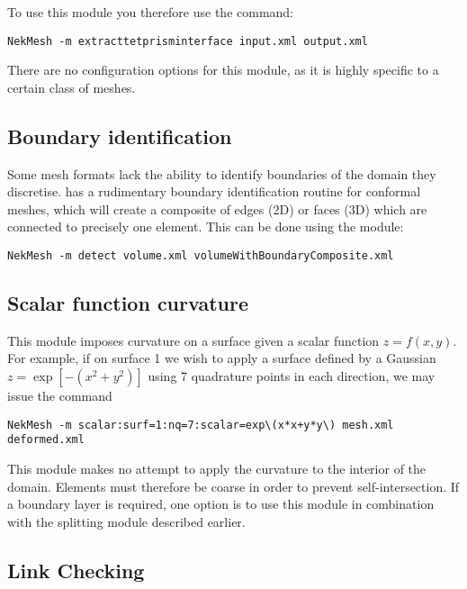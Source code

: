 To use this module you therefore use the command:

\begin{lstlisting}[style=BashInputStyle]
  NekMesh -m extracttetprisminterface input.xml output.xml
\end{lstlisting}

There are no configuration options for this module, as it is highly specific to
a certain class of meshes.

\subsection{Boundary identification}

Some mesh formats lack the ability to identify boundaries of the domain they
discretise. \nm has a rudimentary boundary identification routine for conformal
meshes, which will create a composite of edges (2D) or faces (3D) which are
connected to precisely one element. This can be done using the 
module:

\begin{lstlisting}[style=BashInputStyle]
  NekMesh -m detect volume.xml volumeWithBoundaryComposite.xml
\end{lstlisting}

\subsection{Scalar function curvature}

This module imposes curvature on a surface given a scalar function
$z=f(x,y)$. For example, if on surface 1 we wish to apply a surface defined by a
Gaussian $z = \exp[-(x^2+y^2)]$ using 7 quadrature points in each direction, we
may issue the command

\begin{lstlisting}[style=BashInputStyle]
  NekMesh -m scalar:surf=1:nq=7:scalar=exp\(x*x+y*y\) mesh.xml deformed.xml
\end{lstlisting}

\begin{notebox}
  This module makes no attempt to apply the curvature to the interior of the
  domain. Elements must therefore be coarse in order to prevent
  self-intersection. If a boundary layer is required, one option is to use this
  module in combination with the splitting module described earlier.
\end{notebox}

\subsection{Link Checking}

